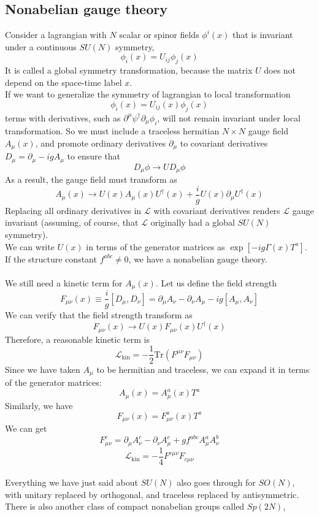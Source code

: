 \documentclass[cyan]{elegantnote}
\begin{document}
\subsection{Nonabelian gauge theory}
Consider a lagrangian with $N$ scalar or spinor fields $\phi^i(x)$ that is invariant under a continuous $SU(N)$ symmetry,
\[\phi_i(x) = U_{ij}\phi_j(x)\]
It is called a global symmetry transformation, because the matrix $U$ does not depend on the space-time label $x$.
\\
If we want to generalize the symmetry of lagrangian to local transformation
\[\phi_i(x) = U_{ij}(x)\phi_j(x)\]
terms with derivatives, such as $\partial^{\mu}\psi^{\dagger} \partial_{\mu}\phi_i$, will not remain invariant under local transformation. 
So we must include a traceless hermitian $N \times N$ gauge field $A_{\mu}(x)$, and promote ordinary derivatives $\partial_{\mu}$ to covariant derivatives $D_{\mu} = \partial_{\mu} - igA_{\mu}$ to ensure that
\[D_{\mu}\phi \to UD_{\mu}\phi\]
As a result, the gauge field must transform as
\[A_{\mu}(x) \to U(x)A_{\mu}(x)U^{\dagger}(x) + \frac{i}{g}U(x)\partial_{\mu}U^{\dagger}(x)\]
Replacing all ordinary derivatives in $\mathcal{L}$ with covariant derivatives renders $\mathcal{L}$ gauge invariant (assuming, of course, that $\mathcal{L}$ originally had a global $SU(N)$ symmetry).\\
We can write $U(x)$ in terms of the generator matrices as
$\exp[-ig\Gamma(x)T^a]$. If the structure constant $f^{abc} \neq 0$, we have a nonabelian gauge theory.
\\ \\
We still need a kinetic term for $A_{\mu}(x)$. Let us define the field strength
\[F_{\mu\nu}(x) \equiv \frac{i}{g}[D_{\mu},D_{\nu}] = \partial_{\mu}A_{\nu} - \partial_{\nu}A_{\mu} - ig[A_{\mu},A_{\nu}]\]
We can verify that the field strength transform as
\[F_{\mu\nu}(x) \to U(x)F_{\mu\nu}(x)U^{\dagger}(x)\]
Therefore, a reasonable kinetic term is
\[\mathcal{L}_{\mathrm{kin}} = - \frac{1}{2} \mathrm{Tr}(F^{\mu\nu}F_{\mu\nu})\]
Since we have taken $A_{\mu}$ to be hermitian and traceless, we can expand it in terms of the generator matrices:
\[A_{\mu}(x) = A^a_{\mu}(x)T^a\]
Similarly, we have
\[F_{\mu\nu}(x) = F^a_{\mu\nu}(x)T^a \]
We can get
\[F^{c}_{\mu\nu} = \partial_{\mu}A^c_{\nu} - \partial_{\nu}A^c_{\mu} + gf^{abc}A^a_{\mu}A^b_{\nu}\]
\[\mathcal{L}_{\mathrm{kin}} = -\frac{1}{4}F^{c\mu\nu}F_{c\mu\nu}\]
\\
Everything we have just said about $SU(N)$ also goes through for $SO(N)$, with unitary replaced by orthogonal, and traceless replaced by antisymmetric. There is also another class of compact nonabelian groups called $Sp(2N)$,
\end{document}
